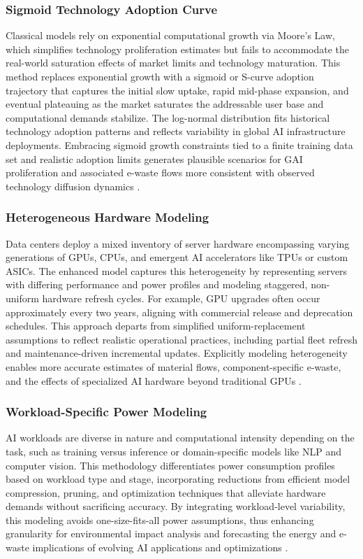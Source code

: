 \documentclass[a4paper, 12pt]{article}
\begin{document}
\subsubsection{Sigmoid Technology Adoption Curve}
Classical models rely on exponential computational growth via Moore’s Law, which simplifies technology proliferation estimates but fails to accommodate the real-world saturation effects of market limits and technology maturation. This method replaces exponential growth with a sigmoid or S-curve adoption trajectory that captures the initial slow uptake, rapid mid-phase expansion, and eventual plateauing as the market saturates the addressable user base and computational demands stabilize. The log-normal distribution fits historical technology adoption patterns and reflects variability in global AI infrastructure deployments. Embracing sigmoid growth constraints tied to a finite training data set and realistic adoption limits generates plausible scenarios for GAI proliferation and associated e-waste flows more consistent with observed technology diffusion dynamics \citep{pamplona-2024, fordyce-2025, wang_2024_ewaste}.

\subsubsection{Heterogeneous Hardware Modeling}
Data centers deploy a mixed inventory of server hardware encompassing varying generations of GPUs, CPUs, and emergent AI accelerators like TPUs or custom ASICs. The enhanced model captures this heterogeneity by representing servers with differing performance and power profiles and modeling staggered, non-uniform hardware refresh cycles. For example, GPU upgrades often occur approximately every two years, aligning with commercial release and deprecation schedules. This approach departs from simplified uniform-replacement assumptions to reflect realistic operational practices, including partial fleet refresh and maintenance-driven incremental updates. Explicitly modeling heterogeneity enables more accurate estimates of material flows, component-specific e-waste, and the effects of specialized AI hardware beyond traditional GPUs \citep{wang_2024_ewaste}.

\subsubsection{Workload-Specific Power Modeling}
AI workloads are diverse in nature and computational intensity depending on the task, such as training versus inference or domain-specific models like NLP and computer vision. This methodology differentiates power consumption profiles based on workload type and stage, incorporating reductions from efficient model compression, pruning, and optimization techniques that alleviate hardware demands without sacrificing accuracy. By integrating workload-level variability, this modeling avoids one-size-fits-all power assumptions, thus enhancing granularity for environmental impact analysis and forecasting the energy and e-waste implications of evolving AI applications and optimizations \citep{wang_2024_ewaste, you-2023}.
\end{document}
